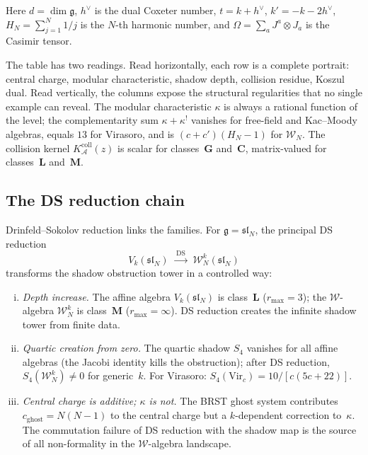 \documentclass[11pt,reqno]{amsart}
\theoremstyle{definition}
\theoremstyle{remark}
\newcommand{\cA}{\mathcal{A}}
\newcommand{\cW}{\mathcal{W}}
\newcommand{\fg}{\mathfrak{g}}
\newcommand{\Vir}{\mathrm{Vir}}
\numberwithin{equation}{section}
\begin{document}
\noindent
Here $d = \dim\fg$, $h^\vee$ is the dual Coxeter number,
$t = k + h^\vee$, $k' = -k - 2h^\vee$,
$H_N = \sum_{j=1}^{N} 1/j$ is the $N$-th harmonic number,
and $\Omega = \sum_a J^a \otimes J_a$ is the Casimir tensor.

The table has two readings. Read horizontally, each row is
a complete portrait: central charge, modular characteristic,
shadow depth, collision residue, Koszul dual. Read
vertically, the columns expose the structural regularities
that no single example can reveal. The modular characteristic
$\kappa$ is always a rational function of the level;
the complementarity sum $\kappa + \kappa^!$ vanishes for
free-field and Kac--Moody algebras, equals $13$ for
Virasoro, and is $(c + c')(H_N - 1)$ for
$\cW_N$. The collision kernel $K_\cA^{\mathrm{coll}}(z)$ is scalar for
classes~$\mathbf{G}$ and~$\mathbf{C}$, matrix-valued for
classes~$\mathbf{L}$ and~$\mathbf{M}$.

\subsection{The DS reduction chain}
\label{ssec:ds-chain}

Drinfeld--Sokolov reduction links the families. For
$\fg = \mathfrak{sl}_N$, the principal DS reduction
\begin{equation}\label{eq:ds-chain}
V_k(\mathfrak{sl}_N)
\;\xrightarrow{\;\mathrm{DS}\;}
\;\cW^k_N(\mathfrak{sl}_N)
\end{equation}
transforms the shadow obstruction tower in a controlled
way:
\begin{enumerate}[(i)]
\item \emph{Depth increase.}
 The affine algebra $V_k(\mathfrak{sl}_N)$ is
 class~$\mathbf{L}$ ($r_{\max} = 3$); the
 $\cW$-algebra $\cW^k_N$ is class~$\mathbf{M}$
 ($r_{\max} = \infty$). DS reduction creates the
 infinite shadow tower from finite data.

\item \emph{Quartic creation from zero.}
 The quartic shadow $S_4$ vanishes for all affine
 algebras (the Jacobi identity kills the
 obstruction); after DS reduction,
 $S_4(\cW^k_N) \ne 0$ for generic~$k$.
 For Virasoro:
 $S_4(\Vir_c) = 10/[c(5c+22)]$.

\item \emph{Central charge is additive; $\kappa$ is not.}
 The BRST ghost system contributes
 $c_{\mathrm{ghost}} = N(N{-}1)$ to the central
 charge but a $k$-dependent correction to~$\kappa$.
 The commutation failure of DS reduction with the
 shadow map is the source of all non-formality in
 the $\cW$-algebra landscape.
\end{enumerate}
\end{document}
